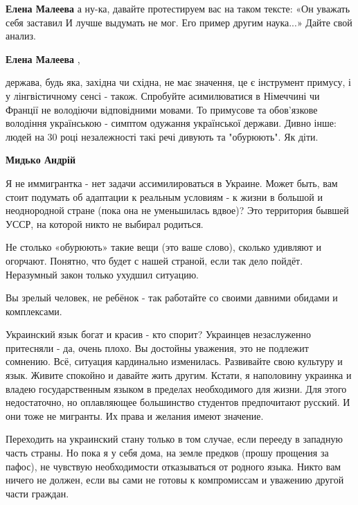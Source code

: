 \begin{itemize}
\begin{itemize}
\textbf{Елена Малеева} а ну-ка, давайте протестируем вас на таком тексте:
«Он уважать себя заставил
И лучше выдумать не мог.
Его пример другим наука...»
Дайте свой анализ.

 
\textbf{Елена Малеева} , 

держава, будь яка, західна чи східна, не має значення, це є інструмент примусу,
і у лінгвістичному сенсі - також. Спробуйте асимилюватися в Німеччині чи
Франції не володіючи відповідними мовами. То примусове та обов'язкове володіння
українською - симптом одужання української держави. Дивно інше: людей на 30
році незалежності такі речі дивують та "обурюють". Як діти.


\textbf{Мидько Андрій} 

Я не иммигрантка - нет задачи ассимилироваться в Украине. Может быть, вам стоит
подумать об адаптации к реальным условиям - к жизни в большой и неоднородной
стране (пока она не уменьшилась вдвое)? Это территория бывшей УССР, на которой
никто не выбирал родиться.

Не столько «обурюють» такие вещи (это ваше слово), сколько удивляют и огорчают.
Понятно, что будет с нашей страной, если так дело пойдёт. Неразумный закон
только ухудшил ситуацию.

Вы зрелый человек, не ребёнок - так работайте со своими давними обидами и
комплексами.

Украинский язык богат и красив - кто спорит? Украинцев незаслуженно притесняли
- да, очень плохо. Вы достойны уважения, это не подлежит сомнению. Всё,
ситуация кардинально изменилась. Развивайте свою культуру и язык. Живите
спокойно и давайте жить другим. Кстати, я наполовину украинка и владею
государственным языком в пределах необходимого для жизни. Для этого
недостаточно, но оплавляющее большинство студентов предпочитают русский. И они
тоже не мигранты. Их права и желания имеют значение.

Переходить на украинский стану только в том случае, если перееду в западную
часть страны. Но пока я у себя дома, на земле предков (прошу прощения за
пафос), не чувствую необходимости отказываться от родного языка. Никто вам
ничего не должен, если вы сами не готовы к компромиссам и уважению другой части
граждан.


\end{itemize}
\end{itemize}

